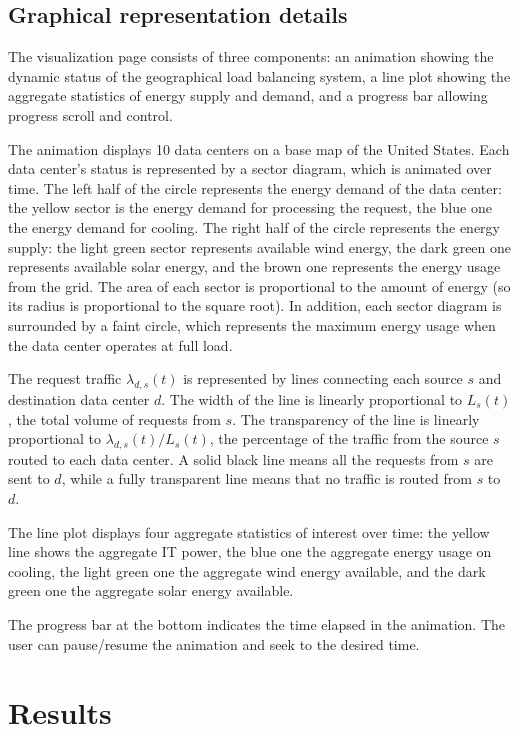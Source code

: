 \documentclass{acm_proc_article-sp}
\begin{document}
\subsection{Graphical representation details}
The visualization page consists of three components: an animation showing the dynamic status of the geographical load balancing system, a line plot showing the aggregate statistics of energy supply and demand, and a progress bar allowing progress scroll and control.

The animation displays 10 data centers on a base map of the United States. Each data center's status is represented by a sector diagram, which is animated over time. The left half of the circle represents the energy demand of the data center: the yellow sector is the energy demand for processing the request, the blue one the energy demand for cooling. The right half of the circle represents the energy supply: the light green sector represents available wind energy, the dark green one represents available solar energy, and the brown one represents the energy usage from the grid. The area of each sector is proportional to the amount of energy (so its radius is proportional to the square root). In addition, each sector diagram is surrounded by a faint circle, which represents the maximum energy usage when the data center operates at full load.

The request traffic $\lambda_{d,s}(t)$ is represented by lines connecting each source $s$ and destination data center $d$. The width of the line is linearly proportional to $L_s(t)$, the total volume of requests from $s$. The transparency of the line is linearly proportional to ${\lambda_{d,s}(t)} / {L_s(t)}$, the percentage of the traffic from the source $s$ routed to each data center. A solid black line means all the requests from $s$ are sent to $d$, while a fully transparent line means that no traffic is routed from $s$ to $d$.

The line plot displays four aggregate statistics of interest over time: the yellow line shows the aggregate IT power, the blue one the aggregate energy usage on cooling, the light green one the aggregate wind energy available, and the dark green one the aggregate solar energy available.

The progress bar at the bottom indicates the time elapsed in the animation. The user can pause/resume the animation and seek to the desired time.


\section{Results}
\end{document}
